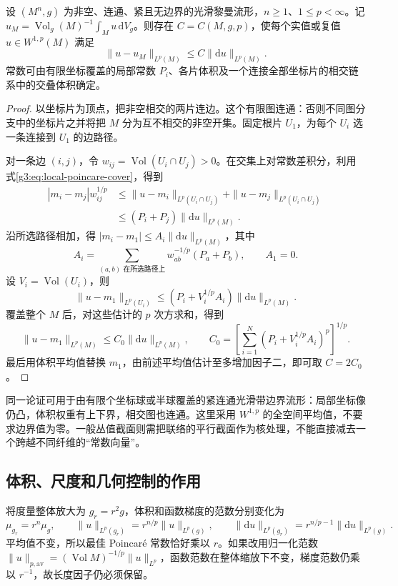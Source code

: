 \begin{theorem}\label{g3:thm:poincare-compact-connected}
	设 \((M^n,g)\) 为非空、连通、紧且无边界的光滑黎曼流形，\(n\ge1\)、\(1\le p<\infty\)。记 \(u_M=\operatorname{Vol}_g(M)^{-1}\int_Mu\,\mathrm dV_g\)。则存在 \(C=C(M,g,p)\)，使每个实值或复值 \(u\in W^{1,p}(M)\) 满足
	\begin{equation}\label{g3:eq:poincare-compact-connected}
		\|u-u_M\|_{L^p(M)}\le C\|\mathrm du\|_{L^p(M)}.
	\end{equation}
	常数可由有限坐标覆盖的局部常数 \(P_i\)、各片体积及一个连接全部坐标片的相交链系中的交叠体积确定。
\end{theorem}
\begin{proof}
	以坐标片为顶点，把非空相交的两片连边。这个有限图连通：否则不同图分支中的坐标片之并将把 \(M\) 分为互不相交的非空开集。固定根片 \(U_1\)，为每个 \(U_i\) 选一条连接到 \(U_1\) 的边路径。

	对一条边 \((i,j)\)，令 \(w_{ij}=\operatorname{Vol}(U_i\cap U_j)>0\)。在交集上对常数差积分，利用式\eqref{g3:eq:local-poincare-cover}，得到
	\[
	\begin{aligned}
		|m_i-m_j|w_{ij}^{1/p}
		&\le\|u-m_i\|_{L^p(U_i\cap U_j)}+\|u-m_j\|_{L^p(U_i\cap U_j)}\\
		&\le(P_i+P_j)\|\mathrm du\|_{L^p(M)}.
	\end{aligned}
	\]
	沿所选路径相加，得 \(|m_i-m_1|\le A_i\|\mathrm du\|_{L^p(M)}\)，其中
	\[
		A_i=\sum_{(a,b)\text{ 在所选路径上}}w_{ab}^{-1/p}(P_a+P_b),\qquad A_1=0.
	\]
	设 \(V_i=\operatorname{Vol}(U_i)\)，则
	\[
		\|u-m_1\|_{L^p(U_i)}\le(P_i+V_i^{1/p}A_i)\|\mathrm du\|_{L^p(M)}.
	\]
	覆盖整个 \(M\) 后，对这些估计的 \(p\) 次方求和，得到
	\[
		\|u-m_1\|_{L^p(M)}\le C_0\|\mathrm du\|_{L^p(M)},
		\qquad C_0=\left[\sum_{i=1}^N(P_i+V_i^{1/p}A_i)^p\right]^{1/p}.
	\]
	最后用体积平均值替换 \(m_1\)，由前述平均值估计至多增加因子二，即可取 \(C=2C_0\)。
\end{proof}

同一论证可用于由有限个坐标球或半球覆盖的紧连通光滑带边界流形：局部坐标像仍凸，体积权重有上下界，相交图也连通。这里采用 \(W^{1,p}\) 的全空间平均值，不要求边界值为零。一般丛值截面则需把联络的平行截面作为核处理，不能直接减去一个跨越不同纤维的“常数向量”。

\subsection{体积、尺度和几何控制的作用}
\label{g3:subsec:1104:04}
将度量整体放大为 \(g_r=r^2g\)，体积和函数梯度的范数分别变化为
\begin{equation}\label{g3:eq:poincare-metric-scaling}
	\mu_{g_r}=r^n\mu_g,\qquad
	\|u\|_{L^p(g_r)}=r^{n/p}\|u\|_{L^p(g)},\qquad
	\|\mathrm du\|_{L^p(g_r)}=r^{n/p-1}\|\mathrm du\|_{L^p(g)}.
\end{equation}
平均值不变，所以最佳 Poincaré 常数恰好乘以 \(r\)。如果改用归一化范数
\(\|u\|_{p,\mathrm{av}}=(\operatorname{Vol}M)^{-1/p}\|u\|_{L^p}\)，函数范数在整体缩放下不变，梯度范数仍乘以 \(r^{-1}\)，故长度因子仍必须保留。

